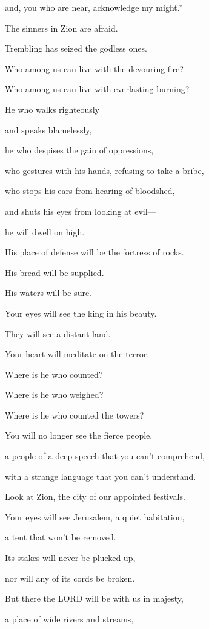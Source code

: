 and, you who are near, acknowledge my might.”

\myverse{}The sinners in Zion are afraid.

Trembling has seized the godless ones.

Who among us can live with the devouring fire?

Who among us can live with everlasting burning?

\myverse{}He who walks righteously

and speaks blamelessly,

he who despises the gain of oppressions,

who gestures with his hands, refusing to take a bribe,

who stops his ears from hearing of bloodshed,

and shuts his eyes from looking at evil—

\myverse{}he will dwell on high.

His place of defense will be the fortress of rocks.

His bread will be supplied.

His waters will be sure.


\vspace{\baselineskip} \myverse{}Your eyes will see the king in his beauty.

They will see a distant land.

\myverse{}Your heart will meditate on the terror.

Where is he who counted?

Where is he who weighed?

Where is he who counted the towers?

\myverse{}You will no longer see the fierce people,

a people of a deep speech that you can’t comprehend,

with a strange language that you can’t understand.

\myverse{}Look at Zion, the city of our appointed festivals.

Your eyes will see Jerusalem, a quiet habitation,

a tent that won’t be removed.

Its stakes will never be plucked up,

nor will any of its cords be broken.

\myverse{}But there the LORD will be with us in majesty,

a place of wide rivers and streams,

